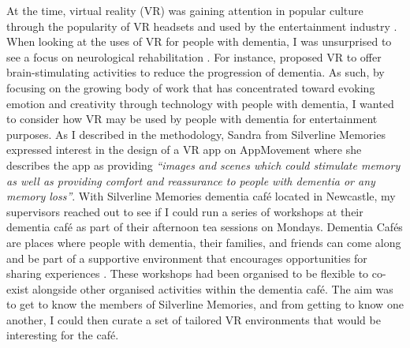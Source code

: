 At the time, virtual reality (VR) was gaining attention in popular culture through the popularity of VR headsets and used by the entertainment industry \citep{cipriani_understanding_2014}. When looking at the uses of VR for people with dementia, I was unsurprised to see a focus on neurological rehabilitation \citep{schultheis_application_2001,mendez2015virtual}. For instance, \citep{garcia2012discussion} proposed VR to offer brain-stimulating activities to reduce the progression of dementia. As such, by focusing on the growing body of work that has concentrated toward evoking emotion \citep{wallace_design-led_2013} and creativity through technology with people with dementia, I wanted to consider how VR may be used by people with dementia for entertainment purposes. As I described in the methodology, Sandra from Silverline Memories expressed interest in the design of a VR app on AppMovement where she describes the app as providing \textit{``images and scenes which could stimulate memory as well as providing comfort and reassurance to people with dementia or any memory loss''}. With Silverline Memories dementia café located in Newcastle, my supervisors reached out to see if I could run a series of workshops at their dementia café as part of their afternoon tea sessions on Mondays. Dementia Cafés are places where people with dementia, their families, and friends can come along and be part of a supportive environment that encourages opportunities for sharing experiences \citep{noauthor_dementia_nodate-1}. These workshops had been organised to be flexible to co-exist alongside other organised activities within the dementia café. The aim was to get to know the members of Silverline Memories, and from getting to know one another, I could then curate a set of tailored VR environments that would be interesting for the café.

